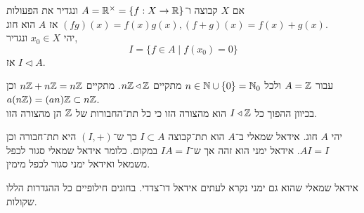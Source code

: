 \begin{example}
	אם $X$ קבוצה ו־$A = \mathbb{R}^\times = \{ f : X \to \mathbb{R} \}$ ונגדיר את הפעולות $(f g)(x) = f(x) g(x), (f + g)(x) = f(x) + g(x)$ אז $A$ הוא חוג. \\
	יהי $x_0 \in X$ ונגדיר,
	\[
		I
		= \{ f \in A \mid f(x_0) = 0 \}
	\]
	אז $I \triangleleft A$.
\end{example}
\begin{example}
	עבור $A = \mathbb{Z}$ ולכל $n \in \mathbb{N} \cup \{ 0 \} = \mathbb{N}_0$ מתקיים $n \mathbb{Z} \triangleleft  \mathbb{Z}$.
	מתקיים $n \mathbb{Z} + n \mathbb{Z} = n \mathbb{Z}$ וכן $a (n \mathbb{Z}) = (a n) \mathbb{Z} \subset n \mathbb{Z}$. \\
	בכיוון ההפוך כל $I \triangleleft  \mathbb{Z}$ הוא מהצורה הזו כי כל תת־החבורות של $\mathbb{Z}$ הן מהצורה הזו.
\end{example}
\begin{definition}
	יהי $A$ חוג.
	אידאל שמאלי ב־$A$ הוא תת־קבוצה $I \subset A$ כך ש־$(I, +)$ היא תת־חבורה וכן $A I = I$.
	אידאל ימני הוא זהה אך ש־$I A = I$ במקום.
	כלומר אידאל שמאלי סגור לכפל משמאל ואידאל ימני סגור לכפל מימין.
\end{definition}
אידאל שמאלי שהוא גם ימני נקרא לעתים אידאל דו־צדדי. בחוגים חילופיים כל ההגדרות הללו שקולות.

